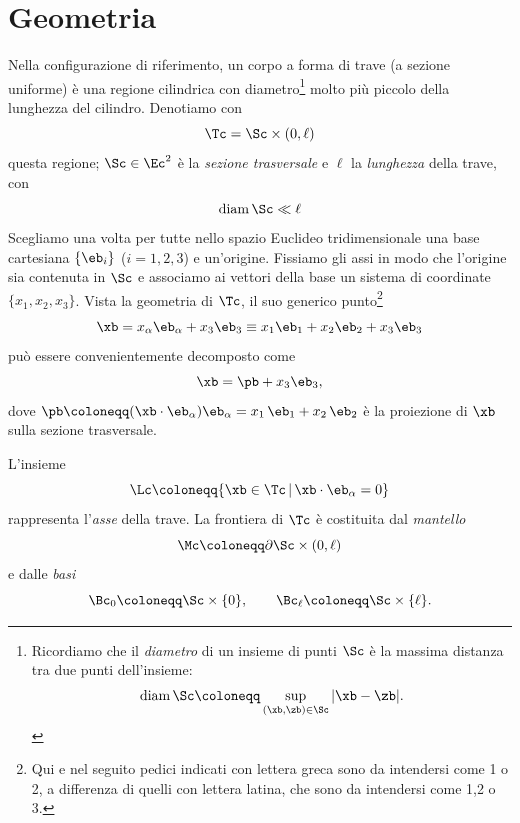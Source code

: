 \section{Geometria}
 Nella configurazione di riferimento, un corpo a forma di trave (a sezione uniforme) è una regione cilindrica con diametro\footnote{Ricordiamo che il \textit{diametro} di un insieme di punti  $\Sc$ è la massima distanza  tra due punti dell'insieme:
 	$$
 	\textrm{diam}\, \Sc\coloneqq\sup_{(\xb, \zb)\in\Sc}|\xb-\zb|.
 	$$
 } molto più piccolo della lunghezza del cilindro. Denotiamo con
 \begin{equation}
 	\Tc=\Sc \times (0,\ell)
 \end{equation}
 questa regione; $\Sc \in \Ec^2$ è la \textit{sezione trasversale} e $\ell$ la \textit{lunghezza} della trave, con
\begin{equation}
	\textrm{diam}\,\Sc\ll \ell
\end{equation}
Scegliamo una volta per tutte nello spazio Euclideo tridimensionale una base cartesiana $\{\eb_i\}$ ($i=1,2,3$) e un'origine.  Fissiamo gli assi in modo che l'origine sia contenuta in $\Sc$ e associamo ai vettori della base un sistema di coordinate $\{x_1, x_2, x_3\}$.
Vista la geometria di $\Tc$, il suo  generico punto\footnote{Qui e nel seguito pedici indicati con lettera greca sono da intendersi come 1 o 2, a differenza di quelli con lettera latina, che sono da intendersi come 1,2 o 3. }
\begin{equation}
	\xb =x_\alpha \eb_{\alpha}+x_3 \eb_3\equiv x_1\eb_1+x_2\eb_2+x_3\eb_3
\end{equation}
può essere convenientemente decomposto come
\begin{equation}
\xb=\pb+x_3 \eb_3,
\end{equation}
dove $\pb\coloneqq (\xb\cdot\eb_{\alpha})\eb_{\alpha}=x_1 \,\eb_1+x_2\,\eb_2$ è la proiezione di $\xb$ sulla sezione trasversale.

 L'insieme
\begin{equation}
\Lc\coloneqq \{ \xb \in \Tc \,|\, \xb\cdot\eb_{\alpha} =0  \}
\end{equation}
 rappresenta l'\textit{asse} della trave. La frontiera di $\Tc$ è costituita dal \textit{mantello}
 \begin{equation}
 	\Mc\coloneqq\partial \Sc \times (0, \ell)
 \end{equation}
 e dalle \textit{basi}
 \begin{equation}
\Bc_0\coloneqq \Sc\times\{0\}, \qquad \Bc_\ell\coloneqq \Sc\times\{\ell\}.
 \end{equation}
 
